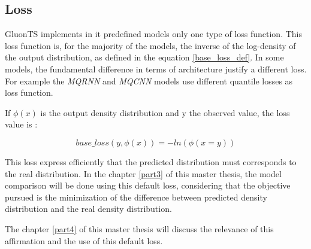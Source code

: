   
  \subsection{Loss} \label{loss}

GluonTS implements in it predefined models only one type of loss function.
This loss function is, for the majority of the models, the inverse of the log-density of the output distribution, as defined in the equation \ref{base_loss_def}. In some models, the fundamental difference in terms of architecture justify a different loss. For example the \textit{MQRNN} and \textit{MQCNN} models use different quantile losses as loss function.


If $\phi(x)$ is the output density distribution and y the observed value, the loss value is : 

\begin{equation} \label{base_loss_def} 
    base\_loss(y, \phi(x) ) = - ln(\phi(x = y) )
\end{equation}


This loss express efficiently that the predicted distribution must corresponds to the real distribution. In the chapter \ref{part3} of this master thesis, the model comparison will be done using this default loss, considering that the objective pursued is the minimization of the difference between predicted density distribution and the real density distribution.

The chapter \ref{part4} of this master thesis will discuss the relevance of this affirmation and the use of this default loss. 




